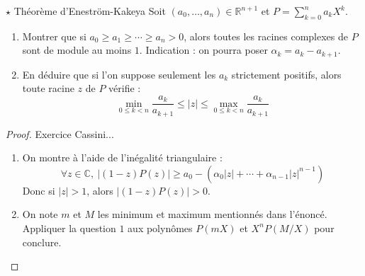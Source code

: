 \documentclass[french,a4paper]{article}
\newcommand{\R}{\mathbb{R}}
\newcommand{\C}{\mathbb{C}}
\theoremstyle{plain}
\theoremstyle{definition}
\theoremstyle{remark}
\begin{document}
\begin{ex}{$\star$ Théorème d'Eneström-Kakeya}
	Soit $(a_0,\ldots,a_n)\in\R^{n+1}$ et $P=\displaystyle\sum_{k=0}^{n}a_kX^k$.
	\begin{enumerate}
		\item Montrer que si $a_0\geqslant a_1\geqslant\cdots\geqslant a_n>0$, alors toutes les racines complexes de $P$ sont de module au moins $1$. Indication : on pourra poser $\alpha_k=a_k-a_{k+1}$.
		\item En déduire que si l'on suppose seulement les $a_k$ strictement positifs, alors toute racine $z$ de $P$ vérifie : $$\min_{0\leqslant k<n}\frac{a_k}{a_{k+1}}\leqslant \lvert z\rvert\leqslant\max_{0\leqslant k<n}\frac{a_k}{a_{k+1}}$$
	\end{enumerate}
\end{ex}
\begin{proof}
	Exercice Cassini...
	\begin{enumerate}
		\item On montre à l'aide de l'inégalité triangulaire : $$\forall z\in\C,\ \lvert (1-z)P(z)\rvert\geqslant a_0-(\alpha_0\lvert z\rvert+\cdots+\alpha_{n-1}\lvert z\rvert^{n-1})$$ Donc si $\lvert z\rvert >1$, alors $\lvert (1-z)P(z)\rvert>0$.
		\item On note $m$ et $M$ les minimum et maximum mentionnés dans l'énoncé. Appliquer la question $1$ aux polynômes $P(mX)$ et $X^nP(M/X)$ pour conclure.
	\end{enumerate}
\end{proof}
\end{document}

